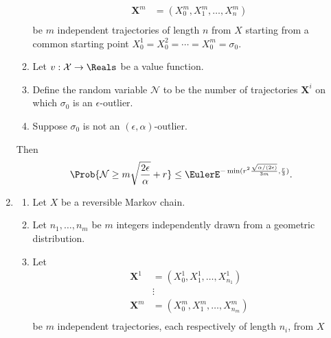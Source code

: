 \documentclass[12pt]{article}
\begin{document}
\begin{enumerate}
\begin{theorem}
\begin{enumerate}
\begin{align*}
                        \mathbf{X}^m &= (X_0^m, X_1^m, \dots, X_n^m )\\
                    \end{align*}
                    be \( m \) independent trajectories of length \( n \)
                    from \( X \) starting from a common starting point \(
                    X_0^1 = X_0^2 = \cdots = X_0^m = \sigma_0 \).
                \item
                    Let \( v :  \mathcal{X} \to \Reals \) be a value
                    function.
                \item
                    Define the random variable \( \mathcal{N} \) to be
                    the number of trajectories \( \mathbf{X}^i \) on
                    which \( \sigma_0 \) is an \( \epsilon \)-outlier.
                \item
                    Suppose \( \sigma_0 \) is not an \( (\epsilon,
                    \alpha) \)-outlier.
            \end{enumerate}
            Then
            \[
                \Prob{\mathcal{N} \ge m \sqrt{\frac{2\epsilon}{\alpha}}
                + r} \le \EulerE^{-\min(r^2 \frac{\sqrt{\alpha/(2\epsilon)}}
                {3m}, \frac{r} {3})}.
            \]
        \end{theorem}
    \item
        \begin{theorem}
            \label{thm:parallelsignificance:thm6point1}
            \begin{enumerate}
                \item
                    Let \( X \) be a reversible Markov chain.
                \item
                    Let \( n_1, \dots, n_m \) be \( m \) integers
                    independently drawn from a geometric distribution.
                \item
                    Let
                    \begin{align*}
                        \mathbf{X}^1 &= (X_0^1, X_1^1, \dots, X_{n_1}^1
                        )\\
                        &\vdots \\
                        \mathbf{X}^m &= (X_0^m, X_1^m, \dots, X_{n_m}^m
                        )\\
                    \end{align*}
                    be \( m \) independent trajectories, each
                    respectively of length \( n_{i} \), from \( X \)

\end{enumerate}
\end{theorem}
\end{enumerate}
\end{document}
